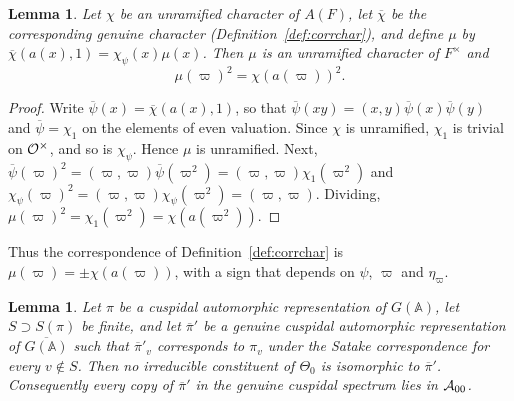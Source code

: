 \documentclass[12pt,letterpaper,openany]{book}
\theoremstyle{plain}
\newtheorem{lemma}[theorem]{Lemma}
\theoremstyle{definition}
\theoremstyle{remark}
\theoremstyle{remark}
\begin{document}
\begin{lemma}\label{lem:square}
Let $\chi$ be an unramified character of $A(F)$, let $\overline\chi$ be
the corresponding genuine character (Definition~\ref{def:corrchar}), and
define $\mu$ by $\overline\chi(a(x),1)=\chi_\psi(x)\mu(x)$. Then $\mu$ is
an unramified character of $F^\times$ and
\[
\mu(\varpi)^2=\chi(a(\varpi))^2 .
\]
\end{lemma}

\begin{proof}
Write $\overline\psi(x)=\overline\chi(a(x),1)$, so that
$\overline\psi(xy)=(x,y)\overline\psi(x)\overline\psi(y)$ and
$\overline\psi=\chi_1$ on the elements of even valuation. Since $\chi$ is
unramified, $\chi_1$ is trivial on ${\cal O}^\times$, and so is $\chi_\psi$.
Hence $\mu$ is unramified. Next,
$\overline\psi(\varpi)^2=(\varpi,\varpi)\overline\psi(\varpi^2)
=(\varpi,\varpi)\chi_1(\varpi^2)$ and
$\chi_\psi(\varpi)^2=(\varpi,\varpi)\chi_\psi(\varpi^2)=(\varpi,\varpi)$.
Dividing, $\mu(\varpi)^2=\chi_1(\varpi^2)=\chi(a(\varpi^2))$.
\end{proof}

Thus the correspondence of Definition~\ref{def:corrchar} is
$\mu(\varpi)=\pm\chi(a(\varpi))$, with a sign that depends on $\psi$,
$\varpi$ and $\eta_\varpi$.

\begin{lemma}\label{lem:A00}
Let $\pi$ be a cuspidal automorphic representation of $G({\mathbb{A}})$,
let $S\supset S(\pi)$ be finite, and let $\overline{\pi}'$ be a genuine
cuspidal automorphic representation of $\overline{G({\mathbb{A}})}$ such
that $\overline{\pi}'_v$ corresponds to $\pi_v$ under the Satake
correspondence for every $v\notin S$. Then no irreducible constituent of
$\Theta_0$ is isomorphic to $\overline\pi'$. Consequently every copy of
$\overline\pi'$ in the genuine cuspidal spectrum lies in ${\cal A}_{00}$.
\end{lemma}
\end{document}
